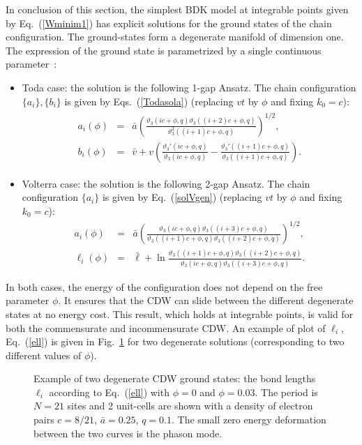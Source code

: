 \documentclass[]{revtex4-1}
\begin{document}
 In conclusion of this section, the simplest BDK model at integrable points given by Eq.~(\ref{Wminim1}) has explicit solutions for the ground states of the chain configuration. The ground-states form a degenerate manifold of dimension one.  The expression of the ground state is parametrized by a single continuous parameter~\cite{BDK}:
 \begin{itemize}
 \item Toda case: the solution is the following 1-gap Ansatz. The chain configuration $\{a_i\}, \{b_i\}$ is given by Eqs.~(\ref{Todasola}) (replacing $vt$ by $\phi$ and fixing $k_0=c$):    \begin{eqnarray}
   \begin{aligned}
  a_i(\phi)&=& \bar{a} \left( \frac{\vartheta_3(ic+ \phi,q)\vartheta_3((i+2)c+\phi,q)}{\vartheta_3^2((i+1)c+\phi,q)} \right)^{1/2}, \label{Todasolabis0}\\
  b_i(\phi) &=& \bar{v}+ v \left(\frac{\vartheta_3'(ic+\phi,q)}{\vartheta_3(ic+\phi,q)}- \frac{\vartheta_3'((i+1)c+\phi,q)}{\vartheta_3((i+1)c+\phi,q)} \right). %
   \end{aligned}
  \end{eqnarray}
 \item Volterra case: the solution is the following 2-gap Ansatz. The chain configuration $\{a_i\}$ is given by Eq.~(\ref{solVgen}) (replacing $vt$ by $\phi$ and fixing $k_0=c$):
   \begin{eqnarray}
   a_{i}(\phi) &=& \bar{a} \left( \frac{ \vartheta_3(ic+\phi,q)\vartheta_3((i+3)c+\phi,q)}{\vartheta_3((i+1)c+\phi,q)\vartheta_3((i+2)c+\phi,q)} \right)^{1/2}, \label{solVgenbis0}
   \\   \ell_{i}(\phi) &=& \bar{\ell} + \ln  \frac{\vartheta_3((i+1)c+\phi,q)\vartheta_3((i+2)c+\phi,q) }{\vartheta_3(ic+\phi,q) \vartheta_3((i+3)c+\phi,q)}.\label{ell}
  \end{eqnarray}
\end{itemize}
 In both cases,  the energy of the configuration does not depend on the free parameter $\phi$. 
 It ensures that the CDW can slide between the different degenerate states at no energy cost. This result, which holds at integrable points, is valid for both the commensurate and incommensurate CDW.
 An example of plot of $\ell_i$, Eq.~(\ref{ell}) is given in Fig.~\ref{CDW} for two degenerate solutions (corresponding to two different values of $\phi$).
 
\begin{figure}[!h]
       \begin{center} 
\end{center} \caption{Example of two degenerate CDW ground states: the bond lengths $\ell_i$ according to Eq.~(\ref{ell}) with $\phi=0$ and $\phi=0.03$.  The period is $N=21$ sites and 2 unit-cells are shown with a density of electron pairs $c=8/21$, $\bar{a}=0.25$, $q=0.1$. The small zero energy deformation between the two curves is the phason mode.}
  \label{CDW}
\end{figure}
 
\end{document}
